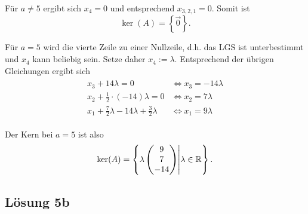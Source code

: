 \documentclass[main.tex]{subfiles}
\begin{document}
Für $a \neq 5$ ergibt sich $x_4 = 0$ und entsprechend $x_{3,2,1} = 0$. Somit ist 
$$
    \ker (A) = \left\{\vec{0}\right\}.
$$

Für $a = 5$ wird die vierte Zeile zu einer Nullzeile, d.h. das LGS ist unterbestimmt und $x_4$ kann beliebig sein.
Setze daher $x_4 := \lambda$. 
Entsprechend der übrigen Gleichungen ergibt sich 
\begin{gather*}
    \begin{align}
        x_3 + 14\lambda = 0 & \Leftrightarrow x_3 = -14 \lambda \\
        x_2 + \frac{1}{2} \cdot (-14) \lambda = 0 & \Leftrightarrow x_2 = 7 \lambda \\
        x_1 + \frac{7}{2} \lambda -14 \lambda + \frac{3}{2} \lambda & \Leftrightarrow x_1 = 9 \lambda 
    \end{align}
\end{gather*}

Der Kern bei $a = 5$ ist also
$$
    \arraycolsep=1pt\def\arraystretch{1}
    \ker (A) = \left\{\lambda \begin{pmatrix}
        9 \\ 7 \\ -14
    \end{pmatrix} \middle| \lambda \in \mathbb{R}  \right\}.
$$



\subsection{Lösung 5b}
\end{document}
